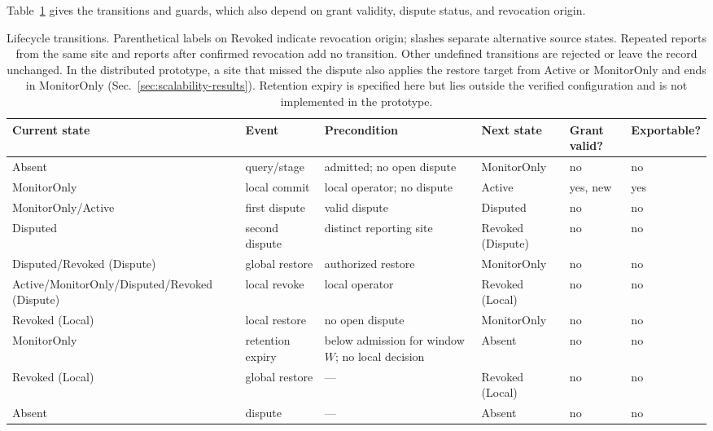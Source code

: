 \documentclass[journal]{IEEEtran}
\theoremstyle{definition}
\begin{document}

Table~\ref{tab:transitions} gives the transitions and guards, which also depend on grant validity, dispute status, and revocation origin.
\begin{table}[ht]
\centering
\caption{Lifecycle transitions. Parenthetical labels on Revoked indicate revocation origin; slashes separate alternative source states. Repeated reports from the same site and reports after confirmed revocation add no transition. Other undefined transitions are rejected or leave the record unchanged. In the distributed prototype, a site that missed the dispute also applies the restore target from Active or MonitorOnly and ends in MonitorOnly (Sec.~\ref{sec:scalability-results}). Retention expiry is specified here but lies outside the verified configuration and is not implemented in the prototype.}
\label{tab:transitions}
\scriptsize
\begin{tabular}{@{}llllll@{}}
\toprule
Current state & Event & Precondition & Next state & Grant valid? & Exportable? \\
\midrule
Absent & query/stage & admitted; no open dispute & MonitorOnly & no & no \\
MonitorOnly & local commit & local operator; no dispute & Active & yes, new & yes \\
MonitorOnly/Active & first dispute & valid dispute & Disputed & no & no \\
Disputed & second dispute & distinct reporting site & Revoked (Dispute) & no & no \\
Disputed/Revoked (Dispute) & global restore & authorized restore & MonitorOnly & no & no \\
Active/MonitorOnly/Disputed/Revoked (Dispute) & local revoke & local operator & Revoked (Local) & no & no \\
Revoked (Local) & local restore & no open dispute & MonitorOnly & no & no \\
MonitorOnly & retention expiry & below admission for window $W$; no local decision & Absent & no & no \\
Revoked (Local) & global restore & --- & Revoked (Local) & no & no \\
Absent & dispute & --- & Absent & no & no \\
\bottomrule
\end{tabular}
\end{table}
\end{document}
